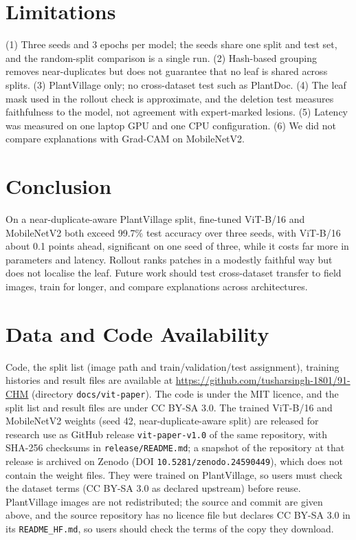 \documentclass[conference]{IEEEtran}
\begin{document}
\section{Limitations}
(1) Three seeds and 3 epochs per model; the seeds share one split and test set, and the random-split comparison is a single run. (2) Hash-based grouping removes near-duplicates but does not guarantee that no leaf is shared across splits. (3) PlantVillage only; no cross-dataset test such as PlantDoc. (4) The leaf mask used in the rollout check is approximate, and the deletion test measures faithfulness to the model, not agreement with expert-marked lesions. (5) Latency was measured on one laptop GPU and one CPU configuration. (6) We did not compare explanations with Grad-CAM on MobileNetV2.

\section{Conclusion}
On a near-duplicate-aware PlantVillage split, fine-tuned ViT-B/16 and MobileNetV2 both exceed 99.7\% test accuracy over three seeds, with ViT-B/16 about 0.1 points ahead, significant on one seed of three, while it costs far more in parameters and latency. Rollout ranks patches in a modestly faithful way but does not localise the leaf. Future work should test cross-dataset transfer to field images, train for longer, and compare explanations across architectures.

\section*{Data and Code Availability}
Code, the split list (image path and train/validation/test assignment), training histories and result files are available at \url{https://github.com/tusharsingh-1801/91-CHM} (directory \texttt{docs/vit-paper}). The code is under the MIT licence, and the split list and result files are under CC BY-SA 3.0. The trained ViT-B/16 and MobileNetV2 weights (seed 42, near-duplicate-aware split) are released for research use as GitHub release \texttt{vit-paper-v1.0} of the same repository, with SHA-256 checksums in \texttt{release/README.md}; a snapshot of the repository at that release is archived on Zenodo (DOI \texttt{10.5281/zenodo.24590449}), which does not contain the weight files. They were trained on PlantVillage, so users must check the dataset terms (CC BY-SA 3.0 as declared upstream) before reuse. PlantVillage images are not redistributed; the source and commit are given above, and the source repository has no licence file but declares CC BY-SA 3.0 in its \texttt{README\_HF.md}, so users should check the terms of the copy they download.
\end{document}
